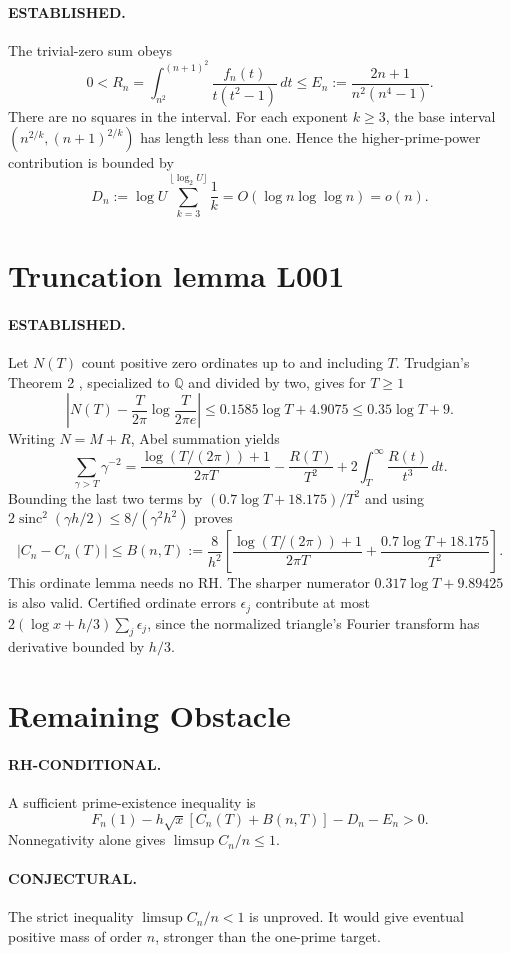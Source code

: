 \documentclass[11pt]{article}
\begin{document}
\paragraph{ESTABLISHED.}
The trivial-zero sum obeys
\[
0<R_n=\int_{n^2}^{(n+1)^2}\frac{f_n(t)}{t(t^2-1)}\,dt
\le E_n:=\frac{2n+1}{n^2(n^4-1)}.
\]
There are no squares in the interval. For each exponent $k\ge3$, the
base interval $(n^{2/k},(n+1)^{2/k})$ has length less than one. Hence the
higher-prime-power contribution is bounded by
\[
D_n:=\log U\sum_{k=3}^{\lfloor\log_2 U\rfloor}\frac1k
=O(\log n\log\log n)=o(n).
\]

\section{Truncation lemma L001}
\paragraph{ESTABLISHED.}
Let $N(T)$ count positive zero ordinates up to and including $T$.
Trudgian's Theorem 2 \cite{trudgian}, specialized to $\mathbb Q$ and divided
by two, gives for $T\ge1$
\[
\left|N(T)-\frac T{2\pi}\log\frac T{2\pi e}\right|
\le0.1585\log T+4.9075\le0.35\log T+9.
\]
Writing $N=M+R$, Abel summation yields
\[
\sum_{\gamma>T}\gamma^{-2}
=\frac{\log(T/(2\pi))+1}{2\pi T}
-\frac{R(T)}{T^2}+2\int_T^\infty\frac{R(t)}{t^3}\,dt.
\]
Bounding the last two terms by $(0.7\log T+18.175)/T^2$ and using
$2\operatorname{sinc}^2(\gamma h/2)\le8/(\gamma^2h^2)$ proves
\[
|C_n-C_n(T)|\le B(n,T):=\frac8{h^2}\left[
\frac{\log(T/(2\pi))+1}{2\pi T}
+\frac{0.7\log T+18.175}{T^2}\right].
\]
This ordinate lemma needs no RH. The sharper numerator
$0.317\log T+9.89425$ is also valid. Certified ordinate errors $\epsilon_j$
contribute at most $2(\log x+h/3)\sum_j\epsilon_j$, since the normalized
triangle's Fourier transform has derivative bounded by $h/3$.

\section{Remaining Obstacle}
\paragraph{RH-CONDITIONAL.}
A sufficient prime-existence inequality is
\[
F_n(1)-h\sqrt{x}[C_n(T)+B(n,T)]-D_n-E_n>0.
\]
Nonnegativity alone gives $\limsup C_n/n\le1$.
\paragraph{CONJECTURAL.}
The strict inequality $\limsup C_n/n<1$ is unproved. It would give
eventual positive mass of order $n$, stronger than the one-prime target.
\end{document}
